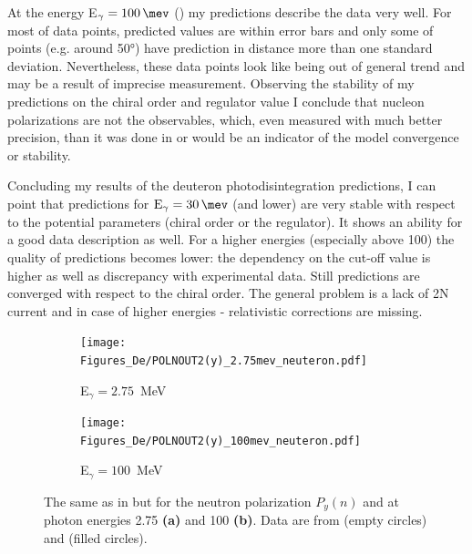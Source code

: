     At the energy E$_\gamma = \SI{100}{\mev}$ () 
    my predictions describe the data very well.
    For most of data points, predicted values are within error bars and only some
    of points (e.g. around \ang{50}) have prediction in distance more than one standard deviation.
    Nevertheless, these data points look like being out of general trend and may be
    a result of imprecise measurement.
    Observing the stability of my predictions on the chiral order and regulator value I 
    conclude that nucleon polarizations are not the observables, which, even measured with much
    better precision, than it was done in \cite{Jewell_neuteronpolarization} or \cite{CAMERON_neuteronpolarization}
    would be an indicator of the model convergence or stability.

    Concluding my results of the deuteron photodisintegration predictions, 
    I can point that predictions for $\text{E}_\gamma = \SI{30}{\mev}$ (and lower)
    are very stable with respect to the potential parameters (chiral order or the regulator).
    It shows an ability for a good data description as well. For a higher energies (especially above \SI{100}{\mev})
    the quality of predictions becomes lower: the dependency on the cut-off value is higher as well as 
    discrepancy with experimental data. Still predictions are converged with respect to the chiral order.
    The general problem is a lack of 2N current and in case of higher energies - relativistic corrections are missing. 


    \begin{figure}[h]
        \centering
        \begin{subfigure}[b]{0.46\textwidth}
            \caption{\small E$_\gamma = 2.75$~MeV}
            \texttt{[image: Figures\_De/POLNOUT2(y)\_2.75mev\_neuteron.pdf]}
            \label{Pn_2p75_vert}
        \end{subfigure}
        \begin{subfigure}[b]{0.46\textwidth}
            \caption{\small E$_\gamma = 100$~MeV}
            \texttt{[image: Figures\_De/POLNOUT2(y)\_100mev\_neuteron.pdf]}
            \label{Pn_100_vert}
        \end{subfigure}
        \caption{The same as in  but for the neutron polarization
        $P_y(n)$ and at photon energies \SI{2.75}{\mev} {\bf (a)} and \SI{100}{\mev} {\bf (b)}.
        Data are from \cite{Jewell_neuteronpolarization} (empty circles)
        and \cite{CAMERON_neuteronpolarization} (filled circles).}
        \label{Pn_2p75_100}
    \end{figure}


